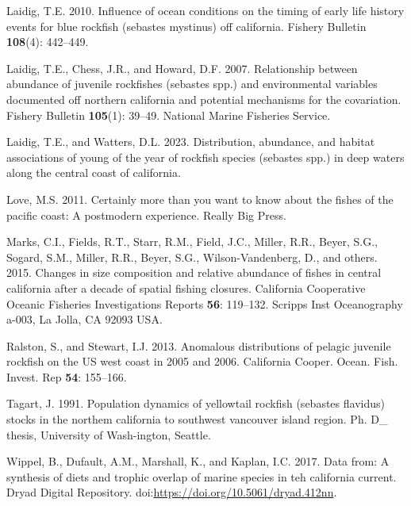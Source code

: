 \documentclass[
]{scrartcl}
\newlength{\cslhangindent}
\newenvironment{CSLReferences}[2] %
 {\begin{list}{}{%
  \setlength{\itemindent}{0pt}
  \setlength{\leftmargin}{0pt}
  \setlength{\parsep}{0pt}
  \ifodd #1
   \setlength{\leftmargin}{\cslhangindent}
   \setlength{\itemindent}{-1\cslhangindent}
  \fi
  \setlength{\itemsep}{#2\baselineskip}}}
 {\end{list}}
\begin{document}
\begin{CSLReferences}{1}{0}
Laidig, T.E. 2010. Influence of ocean conditions on the timing of early
life history events for blue rockfish (sebastes mystinus) off
california. Fishery Bulletin \textbf{108}(4): 442--449.

Laidig, T.E., Chess, J.R., and Howard, D.F. 2007. Relationship between
abundance of juvenile rockfishes (sebastes spp.) and environmental
variables documented off northern california and potential mechanisms
for the covariation. Fishery Bulletin \textbf{105}(1): 39--49. National
Marine Fisheries Service.

Laidig, T.E., and Watters, D.L. 2023. Distribution, abundance, and
habitat associations of young of the year of rockfish species (sebastes
spp.) in deep waters along the central coast of california.

Love, M.S. 2011. Certainly more than you want to know about the fishes
of the pacific coast: A postmodern experience. Really Big Press.

Marks, C.I., Fields, R.T., Starr, R.M., Field, J.C., Miller, R.R.,
Beyer, S.G., Sogard, S.M., Miller, R.R., Beyer, S.G., Wilson-Vandenberg,
D., and others. 2015. Changes in size composition and relative abundance
of fishes in central california after a decade of spatial fishing
closures. California Cooperative Oceanic Fisheries Investigations
Reports \textbf{56}: 119--132. Scripps Inst Oceanography a-003, La
Jolla, CA 92093 USA.

Ralston, S., and Stewart, I.J. 2013. Anomalous distributions of pelagic
juvenile rockfish on the US west coast in 2005 and 2006. California
Cooper. Ocean. Fish. Invest. Rep \textbf{54}: 155--166.

Tagart, J. 1991. Population dynamics of yellowtail rockfish (sebastes
flavidus) stocks in the northem california to southwest vancouver island
region. Ph. D\_ thesis, University of Wash-ington, Seattle.

Wippel, B., Dufault, A.M., Marshall, K., and Kaplan, I.C. 2017. Data
from: A synthesis of diets and trophic overlap of marine species in teh
california current. Dryad Digital Repository.
doi:\url{https://doi.org/10.5061/dryad.412nn}.

\end{CSLReferences}
\end{document}
